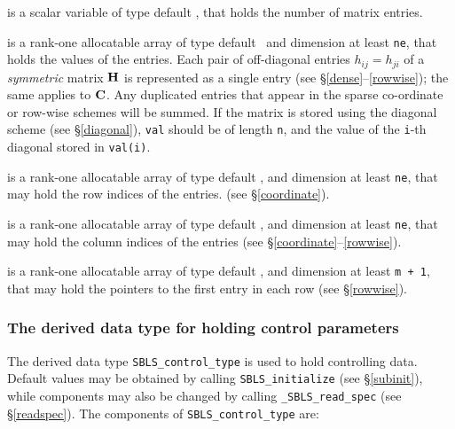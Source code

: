 \documentclass{galahad}
\newcommand{\packagename}{SBLS}
\newcommand{\fullpackagename}{\libraryname\_\packagename}
\begin{document}
\begin{description}
 is a scalar variable of type default \integer, that
holds the number of matrix entries.

 is a rank-one allocatable array of type default \realdp\,
and dimension at least {\tt ne}, that holds the values of the entries.
Each pair of off-diagonal entries $h_{ij} = h_{ji}$ of a {\em symmetric}
matrix ${\mathbf{H}}$ is represented as a single entry
(see \S\ref{dense}--\ref{rowwise}); the same applies to ${\mathbf{C}}$.
Any duplicated entries that appear in the sparse
co-ordinate or row-wise schemes will be summed.
If the matrix is stored using the diagonal scheme (see \S\ref{diagonal}),
{\tt val} should be of length {\tt n}, and the value of the {\tt i}-th
diagonal stored in {\tt val(i)}.

 is a rank-one allocatable array of type default \integer,
and dimension at least {\tt ne}, that may hold the row indices of the entries.
(see \S\ref{coordinate}).

 is a rank-one allocatable array of type default \integer,
and dimension at least {\tt ne}, that may hold the column indices of the entries
(see \S\ref{coordinate}--\ref{rowwise}).

 is a rank-one allocatable array of type default \integer,
and dimension at least {\tt m + 1}, that may hold the pointers to
the first entry in each row (see \S\ref{rowwise}).

\end{description}

\subsubsection{The derived data type for holding control
 parameters}\label{typecontrol}
The derived data type
{\tt \packagename\_control\_type}
is used to hold controlling data. Default values may be obtained by calling
{\tt \packagename\_initialize}
(see \S\ref{subinit}),
while components may also be changed by calling
{\tt \fullpackagename\_read\-\_spec}
(see \S\ref{readspec}).
The components of
{\tt \packagename\_control\_type}
are:
\end{document}
